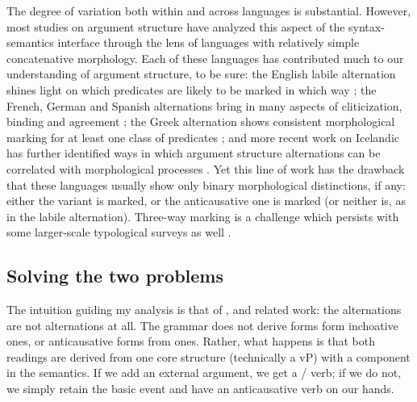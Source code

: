 \begin{exe}
\begin{xlist}
\begin{exe}
\begin{exe}
\begin{exe}
\begin{exe}
\begin{xlist}
\begin{exe}
\begin{xlist}
\begin{xlist}
\begin{xlist}
\begin{exe}
\begin{xlist}
The degree of variation both within and across languages is substantial. However, most studies on argument structure have analyzed this aspect of the syntax-semantics interface through the lens of languages with relatively simple concatenative morphology. Each of these languages has contributed much to our understanding of argument structure, to be sure: the English labile alternation shines light on which predicates are likely to be marked in which way \citep{haspelmath93,unaccusativity95,koontzgarboden09}; the French, German and Spanish alternations bring in many aspects of cliticization, binding and agreement \citep{labelle08,schaefer08,cuervo14}; the Greek alternation shows consistent morphological marking for at least one class of predicates \citep{alexiadoudoron12,layering15}; and more recent work on Icelandic has further identified ways in which argument structure alternations can be correlated with morphological processes \citep{wood14nllt,wood15springer,wood16roots}. Yet this line of work has the drawback that these languages usually show only binary morphological distinctions, if any: either the  variant is marked, or the anticausative one is marked (or neither is, as in the labile alternation). Three-way marking is a challenge which persists with some larger-scale typological surveys as well \citep{haspelmath93,arad05}.

	\subsection{Solving the two problems}
The intuition guiding my analysis is that of \cite{schaefer08}, \cite{layering15} and related work: the alternations are not alternations at all. The grammar does not derive  forms form inchoative ones, or anticausative forms from  ones. Rather, what happens is that both readings are derived from one core structure (technically a vP) with a  component in the semantics. If we add an external argument, we get a / verb; if we do not, we simply retain the basic event and have an anticausative verb on our hands.


\end{xlist}
\end{exe}
\end{xlist}
\end{xlist}
\end{xlist}
\end{exe}
\end{xlist}
\end{exe}
\end{exe}
\end{exe}
\end{exe}
\end{xlist}
\end{exe}
